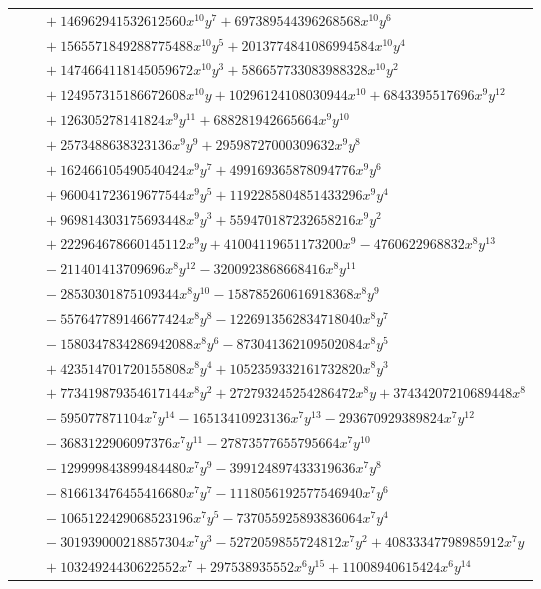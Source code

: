 \documentclass[11pt]{article}
\begin{document}
\begin{longtable}{@{}ll@{}}
 & $\quad +146962941532612560x^{10}y^{7}+697389544396268568x^{10}y^{6}$\\
 & $\quad +1565571849288775488x^{10}y^{5}+2013774841086994584x^{10}y^{4}$\\
 & $\quad +1474664118145059672x^{10}y^{3}+586657733083988328x^{10}y^{2}$\\
 & $\quad +124957315186672608x^{10}y+10296124108030944x^{10}+6843395517696x^{9}y^{12}$\\
 & $\quad +126305278141824x^{9}y^{11}+688281942665664x^{9}y^{10}$\\
 & $\quad +2573488638323136x^{9}y^{9}+29598727000309632x^{9}y^{8}$\\
 & $\quad +162466105490540424x^{9}y^{7}+499169365878094776x^{9}y^{6}$\\
 & $\quad +960041723619677544x^{9}y^{5}+1192285804851433296x^{9}y^{4}$\\
 & $\quad +969814303175693448x^{9}y^{3}+559470187232658216x^{9}y^{2}$\\
 & $\quad +222964678660145112x^{9}y+41004119651173200x^{9}-4760622968832x^{8}y^{13}$\\
 & $\quad -211401413709696x^{8}y^{12}-3200923868668416x^{8}y^{11}$\\
 & $\quad -28530301875109344x^{8}y^{10}-158785260616918368x^{8}y^{9}$\\
 & $\quad -557647789146677424x^{8}y^{8}-1226913562834718040x^{8}y^{7}$\\
 & $\quad -1580347834286942088x^{8}y^{6}-873041362109502084x^{8}y^{5}$\\
 & $\quad +423514701720155808x^{8}y^{4}+1052359332161732820x^{8}y^{3}$\\
 & $\quad +773419879354617144x^{8}y^{2}+272793245254286472x^{8}y+37434207210689448x^{8}$\\
 & $\quad -595077871104x^{7}y^{14}-16513410923136x^{7}y^{13}-293670929389824x^{7}y^{12}$\\
 & $\quad -3683122906097376x^{7}y^{11}-27873577655795664x^{7}y^{10}$\\
 & $\quad -129999843899484480x^{7}y^{9}-399124897433319636x^{7}y^{8}$\\
 & $\quad -816613476455416680x^{7}y^{7}-1118056192577546940x^{7}y^{6}$\\
 & $\quad -1065122429068523196x^{7}y^{5}-737055925893836064x^{7}y^{4}$\\
 & $\quad -301939000218857304x^{7}y^{3}-5272059855724812x^{7}y^{2}+40833347798985912x^{7}y$\\
 & $\quad +10324924430622552x^{7}+297538935552x^{6}y^{15}+11008940615424x^{6}y^{14}$\\

\end{longtable}
\end{document}
